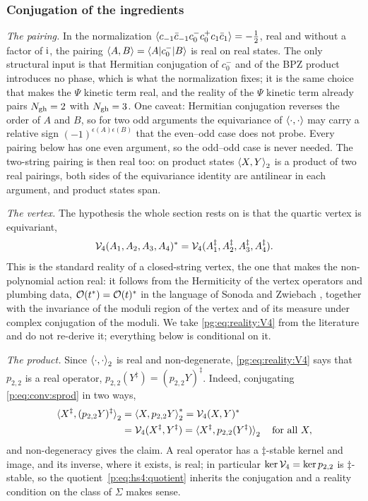 \subsubsection{Conjugation of the ingredients}
\label{pg:sec:reality:ingredients}

\emph{The pairing.}
In the normalization $\braket{c_{-1}\bar c_{-1}c_0^-c_0^+c_1\bar c_1}=-\frac12$, real and without a factor of $\mathrm{i}$, the pairing $\braket{A,B}=\braket{A|c_0^-|B}$ is real on real states.
The only structural input is that Hermitian conjugation of $c_0^-$ and of the BPZ product introduces no phase, which is what the normalization fixes; it is the same choice that makes the $\Psi$ kinetic term real, and the reality of the $\Psi$ kinetic term already pairs $N_{\rm gh}=2$ with $N_{\rm gh}=3$.
One caveat: Hermitian conjugation reverses the order of $A$ and $B$, so for two odd arguments the equivariance of $\braket{\cdot,\cdot}$ may carry a relative sign $(-1)^{\epsilon(A)\epsilon(B)}$ that the even--odd case does not probe.
Every pairing below has one even argument, so the odd--odd case is never needed.
The two-string pairing is then real too: on product states $\braket{X,Y}_2$ is a product of two real pairings, both sides of the equivariance identity are antilinear in each argument, and product states span.

\emph{The vertex.}
The hypothesis the whole section rests on is that the quartic vertex is equivariant,
\begin{equation}
  \label{pg:eq:reality:V4}
  {\mathcal{V}}_4(A_1, A_2, A_3, A_4)^*
    = {\mathcal{V}}_4(A_1^\ddagger, A_2^\ddagger, A_3^\ddagger, A_4^\ddagger).
\end{equation}
This is the standard reality of a closed-string vertex, the one that makes the non-polynomial action real: it follows from the Hermiticity of the vertex operators and plumbing data, ${\mathcal{O}}(t^*)={\mathcal{O}}(t)^*$ in the language of Sonoda and Zwiebach \cite{Sonoda:1990:CovariantClosedString}, together with the invariance of the moduli region of the vertex and of its measure under complex conjugation of the moduli.
We take \eqref{pg:eq:reality:V4} from the literature and do not re-derive it; everything below is conditional on it.

\emph{The product.}
Since $\braket{\cdot,\cdot}_2$ is real and non-degenerate, \eqref{pg:eq:reality:V4} says that $p_{2,2}$ is a real operator, $p_{2,2}(Y^\ddagger)=(p_{2,2}Y)^\ddagger$.
Indeed, conjugating \eqref{p:eq:conv:sprod} in two ways,
\begin{equation}
  \begin{aligned}
    \braket{X^\ddagger, (p_{2,2} Y)^\ddagger}_2
      &
      = \braket{X, p_{2,2} Y}_2^*
      = {\mathcal{V}}_4(X, Y)^*
    \\ &
      = {\mathcal{V}}_4(X^\ddagger, Y^\ddagger)
      = \braket{X^\ddagger, p_{2,2}(Y^\ddagger)}_2
    \quad\text{for all } X,
  \end{aligned}
\end{equation}
and non-degeneracy gives the claim.
A real operator has a $\ddagger$-stable kernel and image, and its inverse, where it exists, is real; in particular $\ker{\mathcal{V}}_4=\ker p_{2,2}$ is $\ddagger$-stable, so the quotient~\eqref{p:eq:hs4:quotient} inherits the conjugation and a reality condition on the class of $\Sigma$ makes sense.

